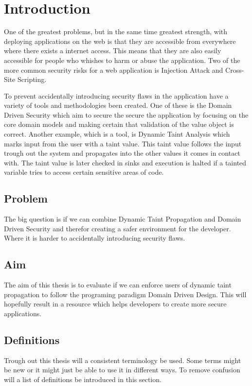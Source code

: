 \chapter{Introduction}
One of the greatest problems, but in the same time greatest strength, with deploying applications on the web is that they are accessible from everywhere where there exists a internet access. This means that they are also easily accessible for people who whishes to harm or abuse the application. Two of the more common security risks for a web application is Injection Attack and Cross-Site Scripting. \parencite{OpenWebApplicationSecurityProject, CrossMichael2007Dgtw}

To prevent accidentally introducing security flaws in the application have a variety of tools and methodologies been created. One of these is the Domain Driven Security which aim to secure the secure the application by focusing on the core domain models and making certain that validation of the value object is correct. Another example, which is a tool, is Dynamic Taint Analysis which marks input from the user with a taint value. This taint value follows the input trough out the system and propagates into the other values it comes in contact with. The taint value is later checked in sinks and execution is halted if a tainted variable tries to access certain sensitive areas of code.


\section{Problem}
The big question is if we can combine Dynamic Taint Propagation and Domain Driven Security and therefor creating a safer environment for the developer. Where it is harder to accidentally introducing security flaws. 


\section{Aim}
The aim of this thesis is to evaluate if we can enforce users of dynamic taint propagation to follow the programing paradigm Domain Driven Design. This will hopefully result in a resource which helps developers to create more secure applications.


\section{Definitions}
Trough out this thesis will a consistent terminology be used. Some terms might be new or it might just be able to use it in different ways. To remove confusion will a list of definitions be introduced in this section.

